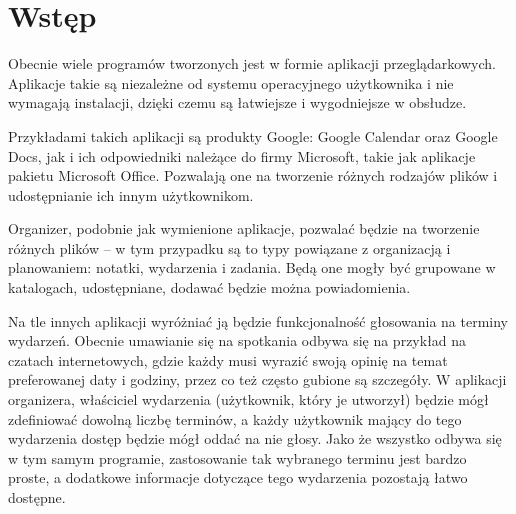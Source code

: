 \documentclass[a4paper,twoside,12pt]{book}
\newcounter{stronyPozaNumeracja}
\begin{document}
\tableofcontents

\setcounter{stronyPozaNumeracja}{\value{page}}
\mainmatter
\pagestyle{empty}

\cleardoublepage

\pagestyle{NumeryStronNazwyRozdzialow}


\chapter{Wstęp}
\label{ch:wstep}


Obecnie wiele programów tworzonych jest w formie aplikacji przeglądarkowych. Aplikacje takie są niezależne od systemu operacyjnego użytkownika i nie wymagają instalacji, dzięki czemu są łatwiejsze i wygodniejsze w obsłudze.

Przykładami takich aplikacji są produkty Google: Google Calendar oraz Google Docs, jak i ich odpowiedniki należące do firmy Microsoft, takie jak aplikacje pakietu Microsoft Office. Pozwalają one na tworzenie różnych rodzajów plików i udostępnianie ich innym użytkownikom.

Organizer, podobnie jak wymienione aplikacje, pozwalać będzie na tworzenie różnych plików -- w tym przypadku są to typy powiązane z organizacją i planowaniem: notatki, wydarzenia i zadania. Będą one mogły być grupowane w katalogach, udostępniane, dodawać będzie można powiadomienia. 

Na tle innych aplikacji wyróżniać ją będzie funkcjonalność głosowania na terminy wydarzeń. Obecnie umawianie się na spotkania odbywa się na przykład na czatach internetowych, gdzie każdy musi wyrazić swoją opinię na temat preferowanej daty i godziny, przez co też często gubione są szczegóły. W aplikacji organizera, właściciel wydarzenia (użytkownik, który je utworzył) będzie mógł zdefiniować dowolną liczbę terminów, a każdy użytkownik mający do tego wydarzenia dostęp będzie mógł oddać na nie głosy. Jako że wszystko odbywa się w tym samym programie, zastosowanie tak wybranego terminu jest bardzo proste, a dodatkowe informacje dotyczące tego wydarzenia pozostają łatwo dostępne.
\end{document}
